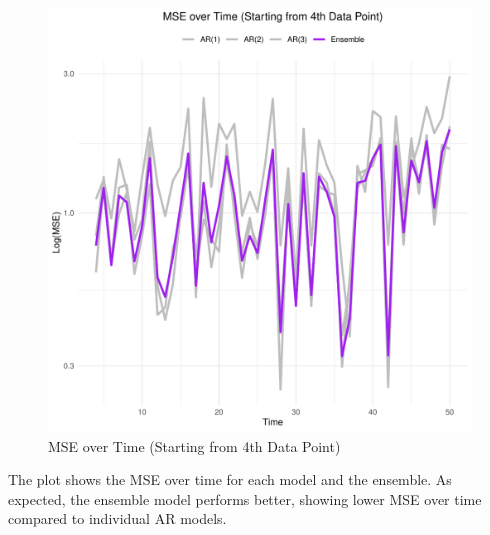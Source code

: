 \documentclass{article}
\begin{document}
\begin{figure}[h]
  \centering
  \includegraphics{mse_plot.pdf}
  \caption{MSE over Time (Starting from 4th Data Point)}
\end{figure}

The plot shows the MSE over time for each model and the ensemble. As expected, the ensemble model performs better, showing lower MSE over time compared to individual AR models.
\end{document}

